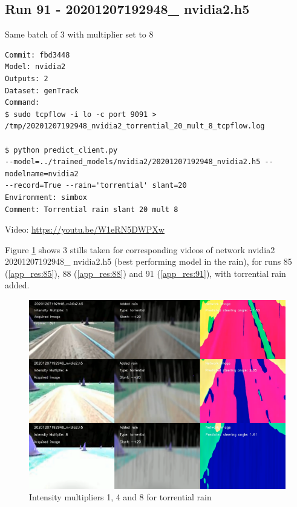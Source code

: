 \subsection{Run 91 - 20201207192948\_ nvidia2.h5 }
Same batch of 3 with multiplier set to 8
\label{app_res:91}
\begin{verbatim}
Commit: fbd3448
Model: nvidia2 
Outputs: 2
Dataset: genTrack
Command:
$ sudo tcpflow -i lo -c port 9091 > 
/tmp/20201207192948_nvidia2_torrential_20_mult_8_tcpflow.log

$ python predict_client.py
--model=../trained_models/nvidia2/20201207192948_nvidia2.h5 --modelname=nvidia2 
--record=True --rain='torrential' slant=20
Environment: simbox
Comment: Torrential rain slant 20 mult 8
\end{verbatim}
Video: \url{https://youtu.be/W1eRN5DWPXw}

Figure \ref{fig:20201207192948_nvidia2_mult_1_4_8_torrential} shows 3 stills taken for corresponding videos of network nvidia2 20201207192948\_ nvidia2.h5 (best performing model in the rain), for runs 85 (\ref{app_res:85}), 88 (\ref{app_res:88}) and 91 (\ref{app_res:91}), with torrential rain added.

\begin{figure}[ht]
 \centering 
 \includegraphics[width=\textwidth]{Figures/20201207192948_nvidia2_mult_1_4_8_torrential.png}
 \caption{Intensity multipliers 1, 4 and 8 for torrential rain}
 \label{fig:20201207192948_nvidia2_mult_1_4_8_torrential}
\end{figure}

